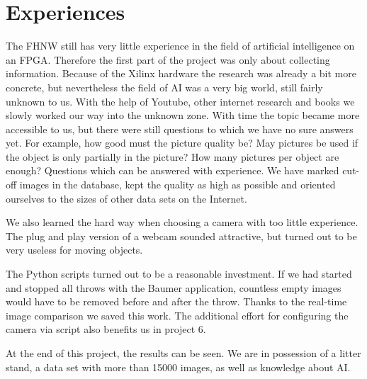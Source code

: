 \section{Experiences}
\label{sec:experiences}

The FHNW still has very little experience in the field of artificial intelligence on an FPGA.
Therefore the first part of the project was only about collecting information.
Because of the Xilinx hardware the research was already a bit more concrete, but nevertheless the field of AI was a very big world, still fairly unknown to us.
With the help of Youtube, other internet research and books we slowly worked our way into the unknown zone. 
With time the topic became more accessible to us, but there were still questions to which we have no sure answers yet.
For example, how good must the picture quality be? 
May pictures be used if the object is only partially in the picture?
How many pictures per object are enough?
Questions which can be answered with experience.
We have marked cut-off images in the database, kept the quality as high as possible and oriented ourselves to the sizes of other data sets on the Internet.

We also learned the hard way when choosing a camera with too little experience.
The plug and play version of a webcam sounded attractive, but turned out to be very useless for moving objects.

The Python scripts turned out to be a reasonable investment.
If we had started and stopped all throws with the Baumer application, countless empty images would have to be removed before and after the throw.
Thanks to the real-time image comparison we saved this work.
The additional effort for configuring the camera via script also benefits us in project 6.

At the end of this project, the results can be seen.
We are in possession of a litter stand, a data set with more than \num{15000} images, as well as knowledge about AI.
